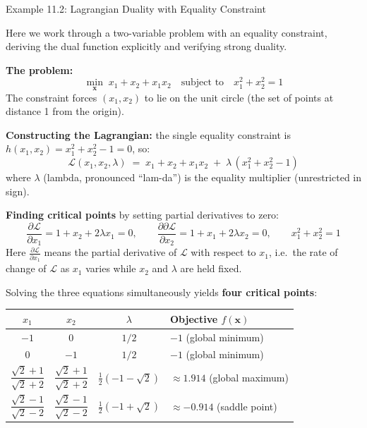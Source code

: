 \documentclass[aspectratio=169,10pt]{beamer}
\newcommand{\bx}{\mathbf{x}}
\newcommand{\calL}{\mathcal{L}}
\begin{document}
\begin{frame}[allowframebreaks]{Example 11.2: Lagrangian Duality with Equality Constraint}

  Here we work through a two-variable problem with an equality constraint,
  deriving the dual function explicitly and verifying strong duality.

  \textbf{The problem:}
  \[
    \min_{\bx}\; x_1 + x_2 + x_1 x_2
    \quad \text{subject to} \quad x_1^2 + x_2^2 = 1
  \]
  The constraint forces $(x_1, x_2)$ to lie on the unit circle (the set of
  points at distance 1 from the origin).

  \medskip
  \textbf{Constructing the Lagrangian:} the single equality constraint is
  $h(x_1, x_2) = x_1^2 + x_2^2 - 1 = 0$, so:
  \[
    \calL(x_1, x_2, \lambda)
    \;=\; x_1 + x_2 + x_1 x_2
    \;+\; \lambda\,(x_1^2 + x_2^2 - 1)
  \]
  where $\lambda$ (lambda, pronounced ``lam-da'') is the equality multiplier
  (unrestricted in sign).

  \medskip
  \textbf{Finding critical points} by setting partial derivatives to zero:
  \[
    \frac{\partial \calL}{\partial x_1} = 1 + x_2 + 2\lambda x_1 = 0,
    \qquad
    \frac{\partial \partial \calL}{\partial x_2} = 1 + x_1 + 2\lambda x_2 = 0,
    \qquad
    x_1^2 + x_2^2 = 1
  \]
  Here $\frac{\partial \calL}{\partial x_1}$ means the partial derivative
  of $\calL$ with respect to $x_1$, i.e.\ the rate of change of $\calL$
  as $x_1$ varies while $x_2$ and $\lambda$ are held fixed.

  \framebreak

  Solving the three equations simultaneously yields \textbf{four critical
  points}:

  \begin{center}
  \begin{tabular}{cccl}
    \toprule
    $x_1$ & $x_2$ & $\lambda$ & Objective $f(\bx)$ \\
    \midrule
    $-1$ & $0$ & $1/2$ & $-1$ \quad (global minimum) \\
    $0$ & $-1$ & $1/2$ & $-1$ \quad (global minimum) \\
    $\dfrac{\sqrt{2}+1}{\sqrt{2}+2}$ & $\dfrac{\sqrt{2}+1}{\sqrt{2}+2}$ &
      $\frac{1}{2}(-1-\sqrt{2})$ & $\approx 1.914$ \quad (global maximum) \\
    $\dfrac{\sqrt{2}-1}{\sqrt{2}-2}$ & $\dfrac{\sqrt{2}-1}{\sqrt{2}-2}$ &
      $\frac{1}{2}(-1+\sqrt{2})$ & $\approx -0.914$ \quad (saddle point) \\
    \bottomrule
  \end{tabular}
  \end{center}


\end{frame}
\end{document}

